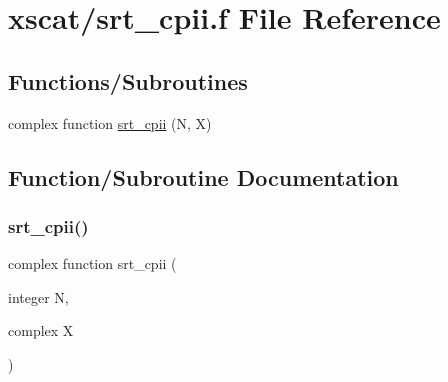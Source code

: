 \hypertarget{xscat_2srt__cpii_8f}{}\section{xscat/srt\+\_\+cpii.f File Reference}
\label{xscat_2srt__cpii_8f}
\subsection*{Functions/\+Subroutines}
\begin{DoxyCompactItemize}
\item 
complex function \hyperlink{xscat_2srt__cpii_8f_a3959b12c24723378936aeafb9dcc7071}{srt\+\_\+cpii} (N, X)
\end{DoxyCompactItemize}


\subsection{Function/\+Subroutine Documentation}
\mbox{\label{xscat_2srt__cpii_8f_a3959b12c24723378936aeafb9dcc7071}} 
\subsubsection{\texorpdfstring{srt\+\_\+cpii()}{srt\_cpii()}}
{\footnotesize\ttfamily complex function srt\+\_\+cpii (\begin{DoxyParamCaption}\item[{integer}]{N,  }\item[{complex}]{X }\end{DoxyParamCaption})}

